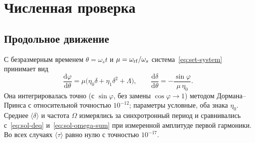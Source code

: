 \section{Численная проверка}
\label{app:num}

\subsection{Продольное движение}

С безразмерным временем $\theta=\omega_s t$ и $\mu=\omega_{\mathrm{rf}}/\omega_s$ система~\eqref{eq:set-system} принимает вид
\begin{equation}
\label{eq:num-sys}
\frac{\mathrm{d}\varphi}{\mathrm{d}\theta}=\mu\bigl(\eta_0\delta+\eta_1\delta^2+\Lambda\bigr),
\qquad
\frac{\mathrm{d}\delta}{\mathrm{d}\theta}=-\frac{\sin\varphi}{\mu\,\eta_0}.
\end{equation}
Она интегрировалась точно (с $\sin\varphi$, без замены $\cos\varphi\to1$) методом Дормана--Принса с относительной точностью $10^{-12}$; параметры условные, оба знака $\eta_0$. Среднее $\langle\delta\rangle$ и частота $\Omega$ измерялись за синхротронный период и сравнивались с~\eqref{eq:sol-deq} и~\eqref{eq:sol-omega-sum} при измеренной амплитуде первой гармоники. Во всех случаях $\langle\tau\rangle$ равно нулю с точностью $10^{-17}$.

